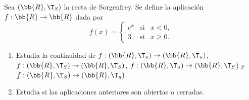 \begin{ejercicio}
    Sea $(\bb{R},\T_S)$ la recta de Sorgenfrey. Se define la aplicación $f : \bb{R} \to \bb{R}$ dada por
    \begin{equation*}
        f(x)=\left\{
            \begin{array}{ccc}
                e^x & \text{si} & x<0,\\
                3 & \text{si} & x\geq 0.
            \end{array}
        \right.
    \end{equation*}
    \begin{enumerate}
        \item Estudia la continuidad de $f : (\bb{R}, \T_u) \to (\bb{R}, \T_u)$, $f : (\bb{R},\T_S) \to (\bb{R},\T_S)$, $f :(\bb{R}, \T_u) \to (\bb{R},\T_S$) y $f : (\bb{R},\T_S) \to (\bb{R}, \T_u)$.
        \item Estudia si las aplicaciones anteriores son abiertas o cerradas.
    \end{enumerate}
\end{ejercicio}

